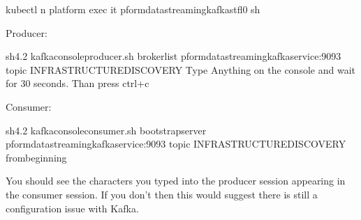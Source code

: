\documentclass[letterpaper,10pt,english]{sphinxmanual}
\begin{document}
\begin{sphinxVerbatim}[commandchars=\\\{\}]
\PYGZdl{} kubectl \PYGZhy{}n platform exec  \PYGZhy{}it pform\PYGZhy{}data\PYGZhy{}streaming\PYGZhy{}kafka\PYGZhy{}stfl\PYGZhy{}0 sh

Producer:

sh\PYGZhy{}4.2\PYGZsh{} kafka\PYGZhy{}console\PYGZhy{}producer.sh \PYGZhy{}\PYGZhy{}broker\PYGZhy{}list pform\PYGZhy{}data\PYGZhy{}streaming\PYGZhy{}kafka\PYGZhy{}service:9093 \PYGZhy{}\PYGZhy{}topic INFRASTRUCTURE\PYGZus{}DISCOVERY
\PYGZlt{}Type Anything on the console and wait for 30 seconds. Than press ctrl+c \PYGZgt{}

Consumer:

sh\PYGZhy{}4.2\PYGZsh{} kafka\PYGZhy{}console\PYGZhy{}consumer.sh \PYGZhy{}\PYGZhy{}bootstrap\PYGZhy{}server pform\PYGZhy{}data\PYGZhy{}streaming\PYGZhy{}kafka\PYGZhy{}service:9093 \PYGZhy{}\PYGZhy{}topic INFRASTRUCTURE\PYGZus{}DISCOVERY \PYGZhy{}\PYGZhy{}from\PYGZhy{}beginning
\end{sphinxVerbatim}

You should see the characters you typed into the producer session appearing in the consumer session. If you don’t then this would suggest there is still a configuration issue with Kafka.
\end{document}
